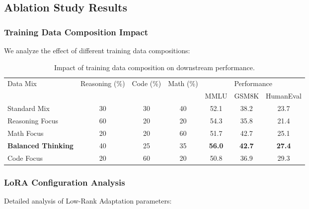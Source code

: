 \begin{table}[H]
\begin{table}[H]
\begin{table}[H]
\subsection{Ablation Study Results}

\subsubsection{Training Data Composition Impact}

We analyze the effect of different training data compositions:

\begin{table}[H]
\centering
\begin{tabular}{lcccccc}
\toprule
\multirow{2}{*}{Data Mix} & \multirow{2}{*}{Reasoning (\%)} & \multirow{2}{*}{Code (\%)} & \multirow{2}{*}{Math (\%)} & \multicolumn{3}{c}{Performance} \\
\cmidrule(lr){5-7}
& & & & MMLU & GSM8K & HumanEval \\
\midrule
Standard Mix & 30 & 30 & 40 & 52.1 & 38.2 & 23.7 \\
Reasoning Focus & 60 & 20 & 20 & 54.3 & 35.8 & 21.4 \\
Math Focus & 20 & 20 & 60 & 51.7 & 42.7 & 25.1 \\
\textbf{Balanced Thinking} & 40 & 25 & 35 & \textbf{56.0} & \textbf{42.7} & \textbf{27.4} \\
Code Focus & 20 & 60 & 20 & 50.8 & 36.9 & 29.3 \\
\bottomrule
\end{tabular}
\caption{Impact of training data composition on downstream performance.}
\label{tab:data-composition}
\end{table}

\subsubsection{LoRA Configuration Analysis}

Detailed analysis of Low-Rank Adaptation parameters:


\end{table}
\end{table}
\end{table}
